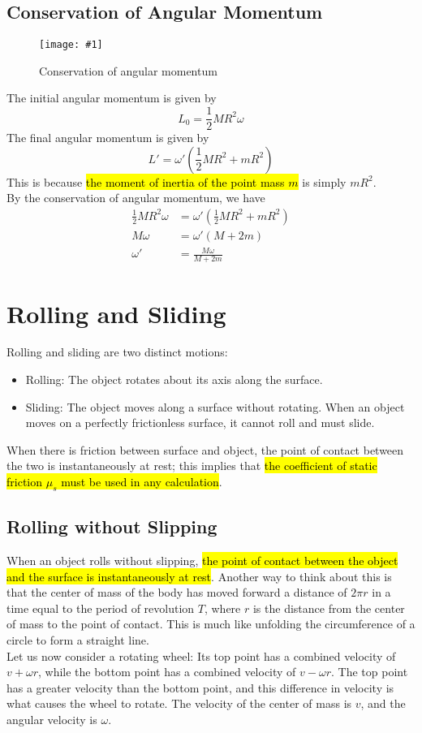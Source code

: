 \documentclass[a4paper,12pt]{article}
\let\oldsection\section
\renewcommand\section{\clearpage\oldsection}
\newcommand{\lb}{\\[8pt]}
\newcommand{\img}[4]{\begin{center}
  \begin{figure}[H]
    \centering
    \texttt{[image: \#1]}
    \caption{#3}
    \label{fig:#4}
  \end{figure}
\end{center}}
\begin{document}
\subsection{Conservation of Angular Momentum}

\img{ex/1.png}{0.95}{Conservation of angular momentum}{conservation}
The initial angular momentum is given by
$$L_0 = \frac{1}{2}MR^2\omega$$
The final angular momentum is given by
$$L' = \omega'\left(\frac{1}{2}MR^2 + mR^2\right)$$
This is because \hl{the moment of inertia of the point mass $m$} is simply $mR^2$.\lb
By the conservation of angular momentum, we have
\begin{align*}
  \frac{1}{2}MR^2\omega & = \omega'\left(\frac{1}{2}MR^2 + mR^2\right) \\
  M\omega               & = \omega'\left(M + 2m\right)                 \\
  \omega'               & = \frac{M\omega}{M + 2m}
\end{align*}


\section{Rolling and Sliding}
Rolling and sliding are two distinct motions:
\begin{itemize}
  \item Rolling: The object rotates about its axis along the surface.
  \item Sliding: The object moves along a surface without rotating. When an object moves on a perfectly frictionless surface, it cannot roll and must slide.
\end{itemize}

When there is friction between surface and object, the point of contact between the two is instantaneously at rest; this implies that \hl{the coefficient of static friction $\mu_s$ must be used in any calculation}.

\subsection{Rolling without Slipping}

When an object rolls without slipping, \hl{the point of contact between the object and the surface is instantaneously at rest}. Another way to think about this is that the center of mass of the body has moved forward a distance of $2\pi r$ in a time equal to the period of revolution $T$, where $r$ is the distance from the center of mass to the point of contact. This is much like unfolding the circumference of a circle to form a straight line.\lb
Let us now consider a rotating wheel: Its top point has a combined velocity of $v + \omega r$, while the bottom point has a combined velocity of $v - \omega r$. The top point has a greater velocity than the bottom point, and this difference in velocity is what causes the wheel to rotate. The velocity of the center of mass is $v$, and the angular velocity is $\omega$.
\end{document}
